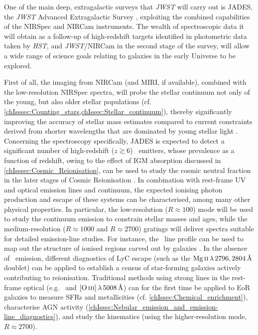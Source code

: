 One of the main deep, extragalactic surveys that \textit{JWST} will carry out is JADES, the \textit{JWST} Advanced Extragalactic Survey \citep[e.g.][]{2018ApJS..236...33W}, exploiting the combined capabilities of the NIRSpec and NIRCam instruments. The wealth of spectroscopic data it will obtain as a follow-up of high-redshift targets identified in photometric data taken by \textit{HST}, and \textit{JWST}/NIRCam in the second stage of the survey, will allow a wide range of science goals relating to galaxies in the early Universe to be explored.

First of all, the imaging from NIRCam (and MIRI, if available), combined with the low-resolution NIRSpec spectra, will probe the stellar continuum not only of the young, but also older stellar populations (cf. \cref{chIsssec:Counting_stars,chIssec:Stellar_continuum}), thereby significantly improving the accuracy of stellar mass estimates compared to current constraints derived from shorter wavelengths that are dominated by young stellar light \citep[e.g.][]{2022arXiv220803281T}. Concerning the spectroscopy specifically, JADES is expected to detect a significant number of high-redshift ($z \gtrsim 6$) \lya\ emitters, whose prevalence as a function of redshift, owing to the effect of IGM absorption discussed in \cref{chIsssec:Cosmic_Reionisation}, can be used to study the cosmic neutral fraction in the later stages of Cosmic Reionisation \citep{2010MNRAS.408.1628S, 2014ApJ...793..113P, 2014MNRAS.443.2831C, 2018ApJ...856....2M, 2019MNRAS.489.2669M, 2022MNRAS.512.5960M}. In combination with rest-frame UV and optical emission lines and continuum, the expected ionising photon production and escape of these systems can be characterised, among many other physical properties. In particular, the low-resolution ($R \approx 100$) mode will be used to study the continuum emission to constrain stellar masses and ages, while the medium-resolution ($R \approx 1000$ and $R \approx 2700$) gratings will deliver spectra suitable for detailed emission-line studies. For instance, the \lya\ line profile can be used to map out the structure of ionised regions carved out by galaxies \citep[``ionised bubbles'';][]{2020MNRAS.499.1395M}. In the absence of \lya\ emission, different diagnostics of LyC escape (such as the $\MgII \, \lambda \, 2796, 2804 \, \Angstrom$ doublet) can be applied to establish a census of star-forming galaxies actively contributing to reionisation. Traditional methods using strong lines in the rest-frame optical (e.g. \Halpha\ and $\OIIIf \, \lambda \, 5008 \, \Angstrom$) can for the first time be applied to EoR galaxies to measure SFRs and metallicities (cf. \cref{chIssec:Chemical_enrichment}), characterise AGN activity (\cref{chIssec:Nebular_emission_and_emission-line_diagnostics}), and study the kinematics (using the higher-resolution mode, $R \approx 2700$).

